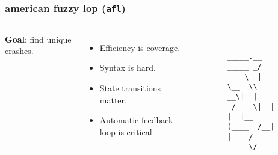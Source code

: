 \begin{frame}[fragile]
\frametitle{american fuzzy lop (\texttt{afl})}

\begin{columns}[c]


\textbf{Goal}: find unique crashes.

\begin{itemize}
    \item Efficiency is coverage.
    \item Syntax is hard.
    \item State transitions matter.
    \item Automatic feedback loop is critical.
\end{itemize}


\begin{figure}
\begin{verbatim}
        _____.__   
_____ _/ ____\  |  
\__  \\   __\|  |  
 / __ \|  |  |  |__
(____  /__|  |____/
     \/            
\end{verbatim}
\end{figure}

\end{columns}

\end{frame}
